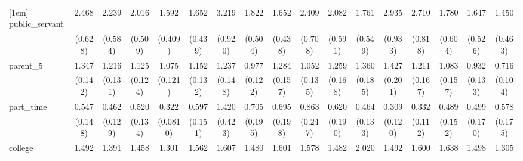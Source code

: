 {\begin{tabular}{l*{16}{c}}
[1em]
public\_servant      &       2.468\sym{***}&       2.239\sym{**} &       2.016\sym{**} &       1.592         &       1.652         &       3.219\sym{***}&       1.822\sym{*}  &       1.652         &       2.409\sym{**} &       2.082\sym{**} &       1.761         &       2.935\sym{***}&       2.710\sym{***}&       1.780         &       1.647         &       1.450         \\
                    &     (0.628)         &     (0.584)         &     (0.509)         &     (0.409)         &     (0.439)         &     (0.920)         &     (0.504)         &     (0.438)         &     (0.708)         &     (0.591)         &     (0.549)         &     (0.933)         &     (0.818)         &     (0.604)         &     (0.526)         &     (0.463)         \\
[1em]
parent\_5            &       1.347\sym{**} &       1.216         &       1.125         &       1.075         &       1.152         &       1.237         &       0.977         &       1.284\sym{*}  &       1.052         &       1.259         &       1.360\sym{*}  &       1.427\sym{*}  &       1.211         &       1.083         &       0.932         &       0.716\sym{*}  \\
                    &     (0.142)         &     (0.131)         &     (0.124)         &     (0.121)         &     (0.132)         &     (0.148)         &     (0.122)         &     (0.157)         &     (0.135)         &     (0.168)         &     (0.185)         &     (0.201)         &     (0.167)         &     (0.157)         &     (0.133)         &     (0.104)         \\
[1em]
part\_time           &       0.547\sym{*}  &       0.462\sym{**} &       0.520\sym{*}  &       0.322\sym{***}&       0.597\sym{*}  &       1.420         &       0.705         &       0.695         &       0.863         &       0.620         &       0.464\sym{**} &       0.309\sym{**} &       0.332\sym{**} &       0.489\sym{*}  &       0.499\sym{*}  &       0.578         \\
                    &     (0.148)         &     (0.129)         &     (0.134)         &    (0.0810)         &     (0.151)         &     (0.423)         &     (0.195)         &     (0.198)         &     (0.247)         &     (0.190)         &     (0.133)         &     (0.120)         &     (0.112)         &     (0.152)         &     (0.170)         &     (0.175)         \\
[1em]
college             &       1.492\sym{**} &       1.391\sym{*}  &       1.458\sym{**} &       1.301         &       1.562\sym{**} &       1.607\sym{**} &       1.480\sym{**} &       1.601\sym{**} &       1.578\sym{**} &       1.482\sym{*}  &       2.020\sym{***}&       1.492\sym{*}  &       1.600\sym{**} &       1.638\sym{**} &       1.498\sym{*}  &       1.305         \\

\end{tabular}}
